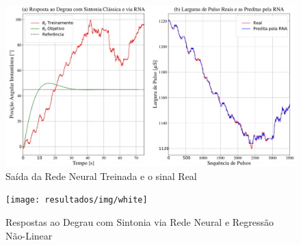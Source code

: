 \begin{figure}[H]
  \caption{Saída da Rede Neural Treinada e o sinal Real}
  \begin{center}
      \includegraphics[scale=0.35]{resultados/img/neural_output}
  \end{center}
  \label{fig:mpu6050_analisys}
\end{figure}



\begin{figure}[H]
  \caption{Respostas ao Degrau com Sintonia via Rede Neural e Regressão Não-Linear}
  \begin{center}
      \texttt{[image: resultados/img/white]}
  \end{center}
  \label{fig:mpu6050_analisys}
\end{figure}

